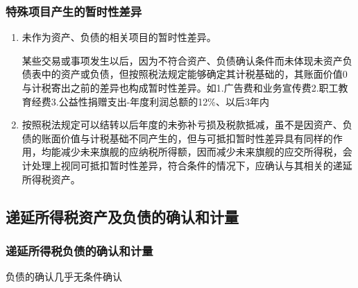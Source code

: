 \documentclass[UTF8,12pt]{ctexart}
\numberwithin{equation}{section} %
\numberwithin{figure}{section}
\numberwithin{table}{section}
\begin{document}
	\subsubsection{特殊项目产生的暂时性差异}
	\begin{enumerate}
		\item 未作为资产、负债的相关项目的暂时性差异。
		
		某些交易或事项发生以后，因为不符合资产、负债确认条件而未体现未资产负债表中的资产或负债，但按照税法规定能够确定其计税基础的，其账面价值0与计税寄出之前的差异也构成暂时性差异。如1.广告费和业务宣传费2.职工教育经费3.公益性捐赠支出-年度利润总额的12\%、以后3年内
		
		\item 按照税法规定可以结转以后年度的未弥补亏损及税款抵减，虽不是因资产、负债的账面价值与计税基础不同产生的，但与可抵扣暂时性差异具有同样的作用，均能减少未来旗舰的应纳税所得额，因而减少未来旗舰的应交所得税，会计处理上视同可抵扣暂时性差异，符合条件的情况下，应确认与其相关的递延所得税资产。
	\end{enumerate}
	
	\subsection{递延所得税资产及负债的确认和计量}
	\subsubsection{递延所得税负债的确认和计量}
	负债的确认几乎无条件确认
\end{document}
